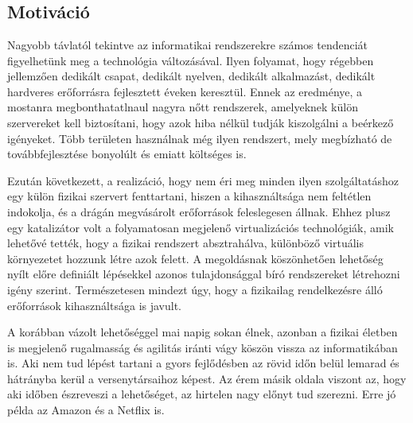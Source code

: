 \chapter{\bevezetes}

\section{Motiváció}

Nagyobb távlatól tekintve az informatikai rendszerekre számos tendenciát figyelhetünk meg a technológia változásával.
Ilyen folyamat, hogy régebben jellemzően dedikált csapat, dedikált nyelven, dedikált alkalmazást, dedikált hardveres erőforrásra fejlesztett éveken keresztül. 
Ennek az eredménye, a mostanra megbonthatatlnaul nagyra nőtt rendszerek, amelyeknek külön szervereket kell biztosítani, hogy azok hiba nélkül tudják kiszolgálni a beérkező igényeket.
Több területen használnak még ilyen rendszert, mely megbízható de továbbfejlesztése bonyolúlt és emiatt költséges is.

Ezután következett, a realizáció, hogy nem éri meg minden ilyen szolgáltatáshoz egy külön fizikai szervert fenttartani, hiszen a kihasználtsága nem feltétlen indokolja, és a drágán megvásárolt erőforrások feleslegesen állnak.
Ehhez plusz egy katalizátor volt a folyamatosan megjelenő virtualizációs technológiák, amik lehetővé tették, hogy a fizikai rendszert absztrahálva, különböző virtuális környezetet hozzunk létre azok felett.
A megoldásnak köszönhetően lehetőség nyílt előre definiált lépésekkel azonos tulajdonsággal bíró rendszereket létrehozni igény szerint. Természetesen mindezt úgy, hogy a fizikailag rendelkezésre álló erőforrások kihasználtsága is javult.

A korábban vázolt lehetőséggel mai napig sokan élnek, azonban a fizikai életben is megjelenő rugalmasság és agilitás iránti vágy köszön vissza az informatikában is. Aki nem tud lépést tartani a gyors fejlődésben az rövid időn belül lemarad és hátrányba kerül a versenytársaihoz képest. Az érem másik oldala viszont az, hogy aki időben észreveszi a lehetőséget, az hirtelen nagy előnyt tud szerezni. Erre jó példa az Amazon\citep{amazon} és a Netflix\citep{netflix} is.  

